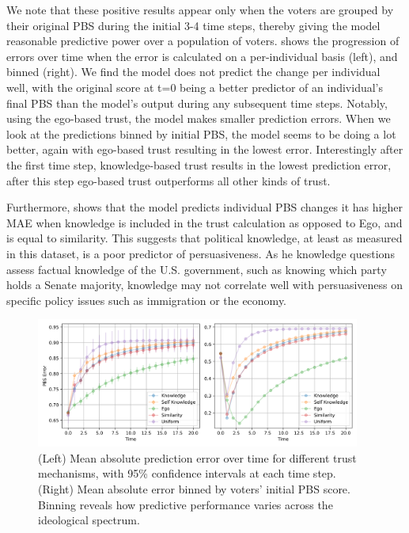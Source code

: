 We note that these positive results appear only when the voters are grouped by
their original PBS during the initial 3-4 time steps, thereby giving the model
reasonable predictive power over a population of voters.  shows the progression of errors over
time when the error is calculated on a per-individual basis (left), and binned
(right). We find the model does not predict the change per individual well,
with the original score at t=0 being a better predictor of an individual's final
PBS than the model's output during any subsequent time steps. Notably, using the ego-based trust, the model makes
smaller prediction errors. When we look at the predictions binned by initial
PBS, the model seems to be doing a lot better, again with ego-based trust
resulting in the lowest error. Interestingly after the first time step,
knowledge-based trust results in the lowest prediction error, after this step
ego-based trust outperforms all other kinds of trust.

Furthermore,  shows that the model predicts individual PBS changes it has higher MAE when
knowledge is included in the trust calculation as opposed to Ego, and is equal
to similarity. This suggests that political knowledge, at least as measured in
this dataset, is a poor predictor of persuasiveness. As he knowledge questions
assess factual knowledge of the U.S. government, such as knowing which party
holds a Senate majority, knowledge may not correlate well with persuasiveness on
specific policy issues such as immigration or the economy.


\begin{figure}[ht]
	\begin{center}
		\includegraphics[width=0.95\textwidth]{Figures/errors_binned.png}
	\end{center}
	\caption{(Left) Mean absolute prediction error over time for different
		trust mechanisms, with 95\% confidence intervals at each time step.
		(Right) Mean absolute error binned by voters' initial PBS score. Binning
		reveals how predictive performance varies across the ideological
		spectrum.}\label{fig:binned_errors}
\end{figure}


